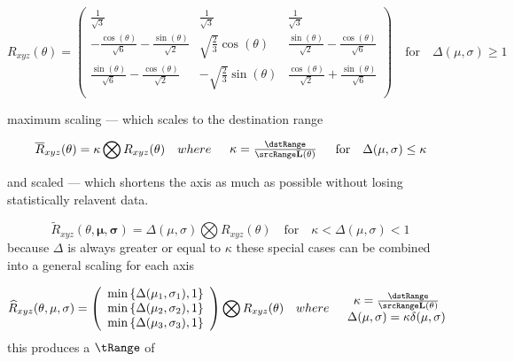 \begin{equation}\label{eq:Rotation}
 R_{xyz}(\theta) = \left(
\begin{array}{ccc}
 \frac{1}{\sqrt{3}} & \frac{1}{\sqrt{3}} & \frac{1}{\sqrt{3}} \\
 -\frac{\cos (\theta )}{\sqrt{6}}-\frac{\sin (\theta )}{\sqrt{2}} &
 \sqrt{\frac{2}{3}} \cos (\theta ) &
 \frac{\sin (\theta )}{\sqrt{2}}-\frac{\cos (\theta )}{\sqrt{6}} \\
 \frac{\sin (\theta )}{\sqrt{6}}-\frac{\cos (\theta )}{\sqrt{2}} &
 -\sqrt{\frac{2}{3}} \sin (\theta ) &
 \frac{\cos (\theta )}{\sqrt{2}}+\frac{\sin (\theta )}{\sqrt{6}} \\
\end{array}
\right) \quad \text{for} \quad  \Delta(\mu,\sigma) \ge 1
\end{equation}

maximum scaling --- which scales to the destination range


\begin{equation}\label{eq:NormRxyz2}
 \overline{R}_{xyz}(\theta) =
\kappa
\bigotimes
R_{xyz}(\theta) \quad where \quad
\begin{array}{c}
\kappa = \frac{\dstRange }{\srcRange \mathbf{L}(\theta)}
\end{array} \quad \text{for} \quad    \Delta(\mu,\sigma) \le \kappa
\end{equation}

 and scaled --- which shortens the axis as much as possible without losing statistically relavent data. 

\begin{equation}\label{eq:CompressedRotation}
 \widetilde{R}_{xyz}(\theta,\mathbf{\mu},\mathbf{\sigma}) =
\Delta(\mu,\sigma)
\bigotimes
R_{xyz}(\theta) \quad \text{for} \quad  \kappa < \Delta(\mu,\sigma) < 1
\end{equation}
because $\Delta$ is always greater or equal to $\kappa$ these special cases can be combined into a general scaling for each axis

\begin{equation}\label{eq:CombinedRotation}
 \widehat{R}_{xyz}(\theta,\mu,\sigma) =
\left(
\begin{array}{c}
\min\left\{\Delta(\mu_1,\sigma_1), 1 \right\} \\
\min\left\{\Delta(\mu_2,\sigma_2), 1 \right\}  \\
\min\left\{\Delta(\mu_3,\sigma_3), 1 \right\}  \\
\end{array}
\right)
\bigotimes
R_{xyz}(\theta) \quad where \quad
\begin{array}{c}
\kappa = \frac{\dstRange }{\srcRange \mathbf{L}(\theta)} \\
\Delta(\mu,\sigma) = \kappa \delta(\mu,\sigma)
\end{array}
\end{equation}
this produces a $\tRange$ of

